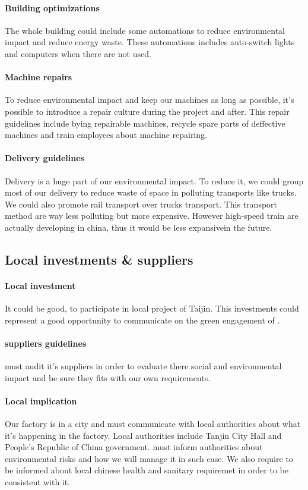 \paragraph{Building optimizations} The whole building could include some automations to reduce environmental impact and reduce energy waste.
These automations includes auto-switch lights and computers when there are not used.

\paragraph{Machine repairs} To reduce environmental impact and keep our machines as long as possible, it's possible to introduce a repair culture during the project and after.
This repair guidelines include bying repairable machines, recycle spare parts of deffective machines and train employees about machine repairing.

\paragraph{Delivery guidelines} Delivery is a huge part of our environmental impact.
To reduce it, we could group most of our delivery to reduce waste of space in polluting transports like trucks.
We could also promote rail transport over trucks transport. This transport method are way less polluting but more expensive. However high-speed train are actually developing in china, thus it would be less expansivein the future.

\subsection{Local investments \& suppliers}

\paragraph{Local investment} It could be good, to participate in local project of Taijin.
This investments could represent a good opportunity to communicate on the green engagement of \moldco.

\paragraph{suppliers guidelines} \moldco must audit it's suppliers in order to evaluate there social and environmental impact and be sure they fits with our own requirements.

\paragraph{Local implication} Our factory is in a city and \moldco must communicate with local authorities about what it's happening in the factory.
Local authorities include Tanjin City Hall and People's Republic of China government.
\moldco must inform authorities about environmental risks and how we will manage it in such case.
We also require to be informed about local chinese health and sanitary requiremet in order to be consistent with it.
